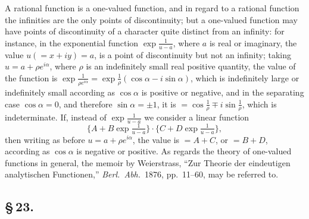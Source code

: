 \documentclass[11pt,a4paper]{book}
\begin{document}
A rational function is a one-valued function, and in regard to a rational function the infinities are the only points of discontinuity; but a one-valued function may have points of discontinuity of a character quite distinct from an infinity: for instance, in the exponential function $\exp\frac{1}{u - a}$, where $a$ is real or imaginary, the value $u (= x + iy) = a$, is a point of discontinuity but not an infinity; taking $u = a + \rho e^{i\alpha}$, where $\rho$ is an indefinitely small real positive quantity, the value of the function is $\exp\frac{1}{\rho e^{i\alpha}} = \exp\frac{1}{\rho}(\cos\alpha - i\sin\alpha)$, which is indefinitely large or indefinitely small according as $\cos\alpha$ is positive or negative, and in the separating case $\cos\alpha = 0$, and therefore $\sin\alpha = \pm 1$, it is $= \cos\frac{1}{\rho} \mp i\sin\frac{1}{\rho}$, which is indeterminate. If, instead of $\exp\frac{1}{u - a}$ we consider a linear function
\[
\{A + B\exp\tfrac{1}{u - a}\} \cdot \{C + D\exp\tfrac{1}{u - a}\},
\]
then writing as before $u = a + \rho e^{i\alpha}$, the value is $= A + C$, or $= B + D$, according as $\cos\alpha$ is negative or positive. As regards the theory of one-valued functions in general, the memoir by Weierstrass, ``Zur Theorie der eindeutigen analytischen Functionen,'' \textit{Berl.\ Abh.}\ 1876, pp.~11--60, may be referred to.

\subsection*{\S\,23.}
\end{document}
